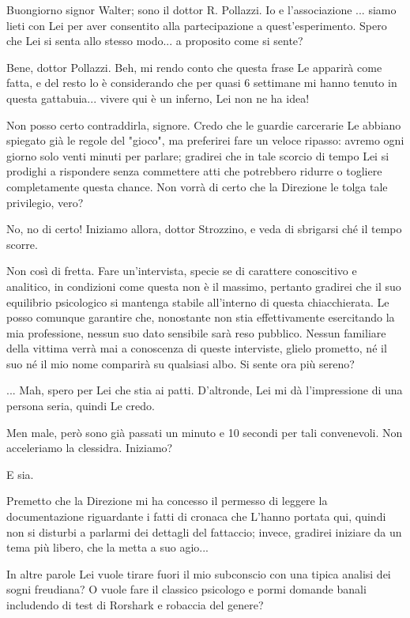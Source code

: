 \documentclass[a4paper,12pt]{article}
\newcommand{\Walter}{\speak{W}}
\newcommand{\Pollazzi}{\speak{P}}
\begin{document}
\begin{dialogue}

\Pollazzi Buongiorno signor Walter; sono il dottor R. Pollazzi. Io e l'associazione ... siamo lieti con Lei per aver consentito alla partecipazione a quest'esperimento. Spero che Lei si senta allo stesso modo... a proposito come si sente?

\Walter Bene, dottor Pollazzi. Beh, mi rendo conto che questa frase Le apparirà come fatta, e del resto lo è considerando che per quasi 6 settimane mi hanno tenuto in questa gattabuia... vivere qui è un inferno, Lei non ne ha idea!

\Pollazzi Non posso certo contraddirla, signore. Credo che le guardie carcerarie Le abbiano spiegato già le regole del "gioco", ma preferirei fare un veloce ripasso: avremo ogni giorno solo venti minuti per parlare; gradirei che in tale scorcio di tempo Lei si prodighi a rispondere senza commettere atti che potrebbero ridurre o togliere completamente questa chance. Non vorrà di certo che la Direzione le tolga tale privilegio, vero?

\Walter No, no di certo! Iniziamo allora, dottor Strozzino, e veda di sbrigarsi ché il tempo scorre.

\Pollazzi Non così di fretta. Fare un'intervista, specie se di carattere conoscitivo e analitico, in condizioni come questa non è il massimo, pertanto gradirei che il suo equilibrio psicologico si mantenga stabile all'interno di questa chiacchierata. Le posso comunque garantire che, nonostante non stia effettivamente esercitando la mia professione, nessun suo dato sensibile sarà reso pubblico. Nessun familiare della vittima verrà mai a conoscenza di queste interviste, glielo prometto, né il suo né il mio nome comparirà su qualsiasi albo. Si sente ora più sereno?

\Walter ... Mah, spero per Lei che stia ai patti. D'altronde, Lei mi dà l'impressione di una persona seria, quindi Le credo.

\Pollazzi Men male, però sono già passati un minuto e 10 secondi per tali convenevoli. Non acceleriamo la clessidra. Iniziamo?

\Walter E sia.

\Pollazzi Premetto che la Direzione mi ha concesso il permesso di leggere la documentazione riguardante i fatti di cronaca che L'hanno portata qui, quindi non si disturbi a parlarmi dei dettagli del fattaccio; invece, gradirei iniziare da un tema più libero, che la metta a suo agio...

\Walter In altre parole Lei vuole tirare fuori il mio subconscio con una tipica analisi dei sogni freudiana? O vuole fare il classico psicologo e pormi domande banali includendo di test di Rorshark e robaccia del genere?


\end{dialogue}
\end{document}
